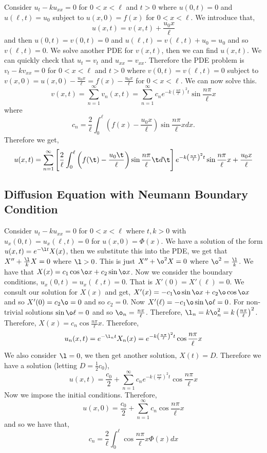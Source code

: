 \begin{eg}
  Consider $u_t - ku_{xx} = 0$ for $0 < x < \ell$ and $t > 0$ where $u(0, t) = 0$ and $u(\ell, t) = u_0$ subject to $u(x, 0) = f(x)$ for $0 < x < \ell$. We introduce that,
  $$ u(x, t) = v(x, t) + \frac{u_0x}{\ell} $$
  and then $u(0, t) = v(0, t) = 0$ and $u(\ell, t) = v(\ell, t) + u_0 = u_0$ and so $v(\ell, t) = 0$. We solve another PDE for $v(x, t)$, then we can find $u(x, t)$. We can quickly check that $u_t = v_t$ and $u_{xx} = v_{xx}$. Therefore the PDE problem is $v_t - kv_{xx} = 0$ for $0 < x < \ell$ and $t > 0$ where $v(0, t) = v(\ell, t) = 0$ subject to $v(x, 0) = u(x, 0 ) - \frac{u_0 x}{\ell} = f(x) - \frac{u_0 x}{\ell}$ for $0 < x < \ell$. We can now solve this.
  $$ v(x, t) = \sum_{n=1}^\infty v_n(x, t) = \sum_{n=1}^\infty c_n e^{-k\left( \frac{n\pi}{\ell} \right)^2 t}\sin \frac{n\pi}{\ell} x $$
  where
  $$c_n = \frac{2}{\ell}\int_0^\ell \left(f(x) - \frac{u_0x}{\ell}\right) \sin \frac{n\pi}{\ell}xdx.$$
  Therefore we get,
  $$ u(x, t)= \sum_{n=1}^\infty \left[ \frac{2}{\ell}\int_0^\ell \left(f(\t) - \frac{u_0\t}{\ell}\right) \sin \frac{n\pi}{\ell}\t d\t \right] e^{-k\left( \frac{n\pi}{\ell} \right)^2 t}\sin \frac{n\pi}{\ell} x + \frac{u_0x}{\ell}$$
\end{eg}

\subsection{Diffusion Equation with Neumann Boundary Condition}
Consider $u_t - ku_{xx} = 0$ for $0 < x < \ell$ where $t, k > 0$ with $u_x(0, t) = u_x(\ell, t) = 0$ for $u(x, 0) = \Phi(x)$. We have a solution of the form $u(x, t) = e^{-\l t}X(x)$, then we substitute this into the PDE, we get that $X'' + \frac{\l}{k}X = 0$ where $\l > 0$. This is just $X'' + \o^2 X = 0$ where $\o^2 =
\frac{\l}{k}$. We have that $X(x) = c_1\cos \o x + c_2\sin \o x$. Now we consider the boundary conditions, $u_x(0, t) = u_x(\ell, t) = 0$. That is $X'(0) = X'(\ell) = 0$. We consult our solution for $X(x)$ and get, $X'(x) = -c_1\o \sin\o x + c_2\o \cos \o x$ and so $X'(0) = c_2\o = 0$ and so $c_2 = 0$. Now $X'(\ell) = -c_1\o\sin \o \ell = 0$.
For non-trivial solutions $\sin \o\ell = 0$ and so $\o_n = \frac{n\pi}{\ell}$. Therefore, $\l_n = k\o_n^2 = k\left( \frac{n\pi}{\ell} \right)^2$. Therefore, $X(x) = c_n\cos \frac{n\pi}{\ell}x$. Therefore,
$$ u_n(x, t) = e^{-\l_n t}X_n(x) = e^{-k\left( \frac{n\pi}{\ell} \right)^2 t}\cos \frac{n\pi}{\ell }x $$
We also consider $\l = 0$, we then get another solution, $X(t) = D$. Therefore we have a solution (letting $D = \frac{1}{2}c_0$),
$$ u(x, t) = \frac{c_0}{2} + \sum_{n=1}^\infty c_ne^{-k\left( \frac{n\pi}{\ell} \right)^2 t}\cos \frac{n\pi}{\ell }x $$
Now we impose the initial conditions. Therefore,
$$ u(x, 0) = \frac{c_0}{2} + \sum_{n=1}^\infty c_n\cos \frac{n\pi}{\ell }x $$
and so we have that,
$$ c_n = \frac{2}{\ell}\int_0^\ell \cos \frac{n\pi}{\ell}x \Phi(x)dx  $$

